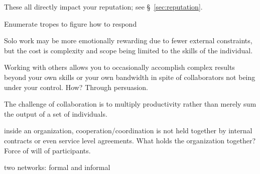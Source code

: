 These all directly impact your reputation; see \S~\ref{sec:reputation}.


Enumerate tropes to figure how to respond

Solo work may be more emotionally rewarding due to fewer external constraints, but the cost is complexity and scope being limited to the skills of the individual. 

Working with others allows you to occasionally accomplish complex results beyond your own skills or your own bandwidth in spite of collaborators not being under your control. How? Through persuasion. 

The challenge of collaboration is to multiply productivity rather than merely sum the output of a set of individuals. 

inside an organization, cooperation/coordination is not held together by internal contracts or even service level agreements. What holds the organization together? Force of will of participants. 

two networks: formal and informal